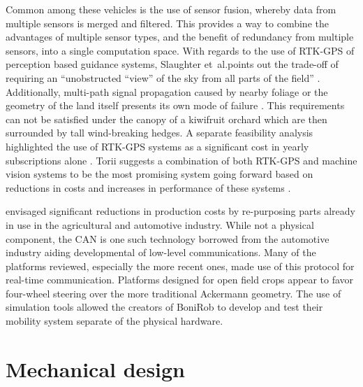 \documentclass[preprint,authoryear,12pt]{elsarticle}
\begin{document}
    Common among these vehicles is the use of sensor fusion, whereby data from multiple sensors is merged and filtered.
    This provides a way to combine the advantages of multiple sensor types, and the benefit of redundancy from multiple sensors, into a single computation space.
    With regards to the use of RTK-GPS of perception based guidance systems, Slaughter et~al.\@ points out the trade-off of requiring an ``unobstructed ``view'' of the sky from all parts of the field'' \citep{Slaughter2008}.
    Additionally, multi-path signal propagation caused by nearby foliage or the geometry of the land itself presents its own mode of failure \citep{Durrant-Whyte2005}.
    This requirements can not be satisfied under the canopy of a kiwifruit orchard which are then surrounded by tall wind-breaking hedges.
    A separate feasibility analysis highlighted the use of RTK-GPS systems as a significant cost in yearly subscriptions alone \citep{Pedersen2006}.
    Torii suggests a combination of both RTK-GPS and machine vision systems to be the most promising system going forward based on reductions in costs and increases in performance of these systems \cite{Torii2000}.


    \cite{Blackmore2007} envisaged significant reductions in production costs by re-purposing parts already in use in the agricultural and automotive industry.
    While not a physical component, the CAN is one such technology borrowed from the automotive industry aiding developmental of low-level communications.
    Many of the platforms reviewed, especially the more recent ones, made use of this protocol for real-time communication.
    Platforms designed for open field crops appear to favor four-wheel steering over the more traditional Ackermann geometry.
    The use of simulation tools allowed the creators of BoniRob to develop and test their mobility system separate of the physical hardware.

\section{Mechanical design}
\label{sect:mechanical}
\end{document}
